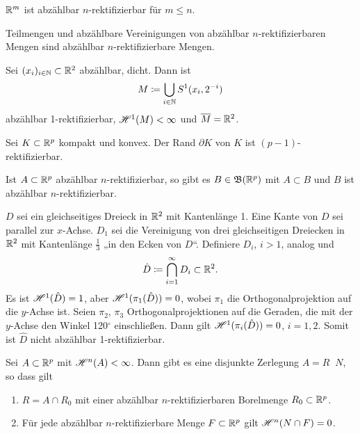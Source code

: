 \documentclass[a4paper,twoside,DIV15,BCOR12mm]{scrbook}
\newcommand{\borel}{\mathfrak B}
\newcommand{\HM}{\H}
\begin{document}
\begin{beispiele}
\item $\mathbb{R}^m$ ist abzählbar $n$-rektifizierbar für $m \le n$.
\item Teilmengen und abzählbare Vereinigungen von abzählbar $n$-rektifizierbaren Mengen sind abzählbar  $n$-rektifizierbare Mengen.
\item Sei $(x_i)_{i\in \mathbb{N}} \subset \mathbb{R}^2$ abzählbar, dicht. Dann  ist
\[
M \da \bigcup_{i\in\MdN} S^1(x_i,2^{-i})
\]
abzählbar 1-rektifizierbar, $\HM^1(M) <\infty$ und $\overline M = \mathbb{R}^2$.
\item Sei $K\subset \mathbb{R}^p$ kompakt und konvex. Der Rand $\partial K$ von $K$ ist $(p-1)$-rektifizierbar.
\item Ist $A\subset \mathbb{R}^p$ abzählbar $n$-rektifizierbar, so gibt es $B\in \borel(\MdR^p)$ mit $A\subset B$ und $B$ ist abzählbar $n$-rektifizierbar.
\item $D$ sei ein gleichseitiges Dreieck in $\mathbb{R}^2$ mit Kantenlänge 1. Eine Kante von $D$ sei parallel zur $x$-Achse. $D_1$ sei die Vereinigung von drei gleichseitigen Dreiecken in $\mathbb{R}^2$ mit Kantenlänge $\frac13$ „in den Ecken von $D$“. Definiere $D_i$, $i>1$, analog und 
\[
\hat D \da \bigcap_{i=1}^\infty D_i \subset \MdR^2.
\]
Es ist $\HM^1(\hat D)=1$, aber $\HM^1(\pi_1(\hat D))=0$, wobei $\pi_1$ die Orthogonalprojektion auf die $y$-Achse ist. Seien $\pi_2$, $\pi_3$ Orthogonalprojektionen auf die Geraden, die mit der $y$-Achse den Winkel 120$^\circ$ einschließen. Dann gilt $\HM^1(\pi_i(\hat D)) = 0$, $i=1,2$. Somit ist $\hat D$ nicht abzählbar 1-rektifizierbar.
\end{beispiele}

\begin{satz}[Struktursatz]
Sei $A\subset\mathbb{R}^p$ mit $\HM^n(A)<\infty$. Dann gibt es eine disjunkte Zerlegung $A= R \mathop{\dot\cup} N$, so 
dass gilt 
\begin{enumerate}[\quad(a)]
\item $R= A\cap R_0$ mit einer abzählbar $n$-rektifizierbaren Borelmenge $R_0\subset \mathbb{R}^p$.
\item Für jede abzählbar $n$-rektifizierbare Menge $F\subset \mathbb{R}^p$ gilt $\HM^n(N\cap F)=0$.
\end{enumerate}
\end{satz}
\end{document}
